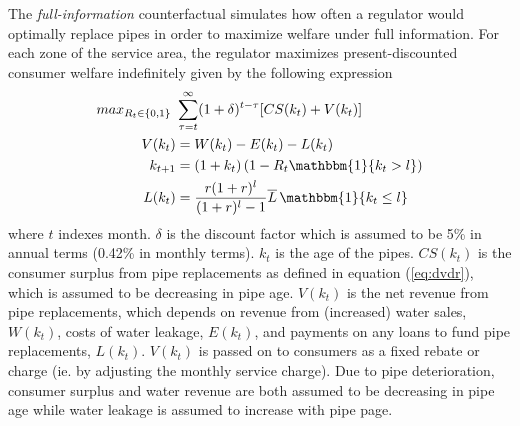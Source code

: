 \documentclass[12pt,table]{article}
\begin{document}




The \textit{full-information} counterfactual simulates how often a regulator would optimally replace pipes in order to maximize welfare under full information.  For each zone of the service area, the regulator maximizes present-discounted consumer welfare indefinitely given by the following expression
\begin{align*}
max_{R_t\in\{0,1\}} \,\, &\sum_{\tau = t}^{\infty} (1+\delta)^{t-\tau} [CS(k_{t}) + V(k_{t})]  \\
V(k_{t}) &= W(k_{t}) - E(k_{t}) - L(k_{t})\\ 
k_{t+1} &=  (1 + k_t) \, (1-R_t \mathbbm{1} \{ k_{t}> l\}) \\
L(k_t) &= \frac{r(1+r)^{l} }{(1+r)^{l} -1 }\overline{L} \, \mathbbm{1} \{ k_{t}\leq l \}
\end{align*}
where $t$ indexes month.  $\delta$ is the discount factor which is assumed to be 5\% in annual terms (0.42\% in monthly terms).  $k_t$ is the age of the pipes.  $CS(k_{t})$ is the consumer surplus from pipe replacements as defined in equation (\ref{eq:dvdr}), which is assumed to be decreasing in pipe age.  $V(k_t)$ is the net revenue from pipe replacements, which depends on revenue from (increased) water sales, $W(k_{t})$, costs of water leakage, $E(k_{t})$, and payments on any loans to fund pipe replacements, $L(k_t)$.  $V(k_t)$ is passed on to consumers as a fixed rebate or charge (ie. by adjusting the monthly service charge).  Due to pipe deterioration, consumer surplus and water revenue are both assumed to be decreasing in pipe age while water leakage is assumed to increase with pipe page.  
\end{document}
